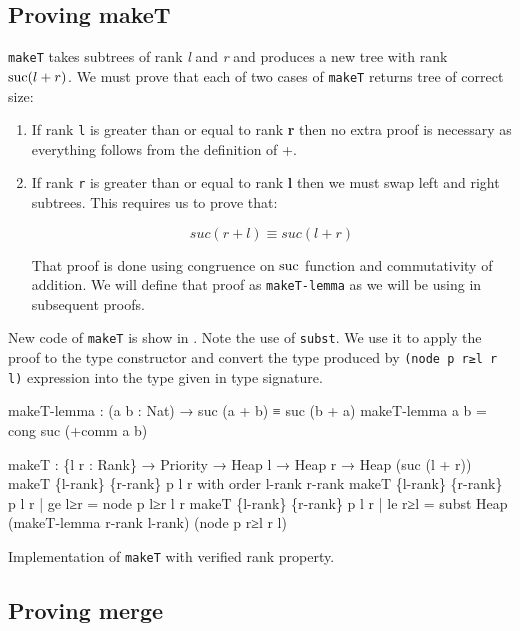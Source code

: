 \subsection{Proving makeT}\label{sec:twopass-makeT-proof}

\texttt{makeT} takes subtrees of rank \textit{l} and \textit{r} and produces a new tree with rank $\operatorname{suc}(l + r)$. We must prove that each of two cases of \texttt{makeT} returns tree of correct size:

\begin{enumerate}
 \item If rank \texttt{l} is greater than or equal to rank \textbf{r} then no extra proof is necessary as everything follows from the definition of +.
 \item If rank \texttt{r} is greater than or equal to rank \textbf{l} then we must swap left and right subtrees. This requires us to prove that:

\begin{equation*}
suc (r + l) ≡ suc (l + r)
\end{equation*}

That proof is done using congruence on $\operatorname{suc}$ function and commutativity of addition. We will define that proof as \texttt{makeT-lemma} as we will be using in subsequent proofs.
\end{enumerate}
\noindent
New code of \texttt{makeT} is show in . Note the use of \texttt{subst}. We use it to apply the proof to the \Heap type constructor and convert the type produced by \texttt{(node p r≥l r l)} expression into the type given in type signature. %

\begin{listing}[thb!]
\begin{code}
makeT-lemma : (a b : Nat) → suc (a + b) ≡ suc (b + a)
makeT-lemma a b = cong suc (+comm a b)

makeT : \{l r : Rank\} → Priority → Heap l → Heap r → Heap (suc (l + r))
makeT \{l-rank\} \{r-rank\} p l r with order l-rank r-rank
makeT \{l-rank\} \{r-rank\} p l r | ge l≥r
  = node p l≥r l r
makeT \{l-rank\} \{r-rank\} p l r | le r≥l
  = subst Heap (makeT-lemma r-rank l-rank) (node p r≥l r l)
\end{code}
\caption{Implementation of \texttt{makeT} with verified rank property.}\label{lst:rank-proof-makeT-two-pass}
\end{listing}

\subsection{Proving merge}

